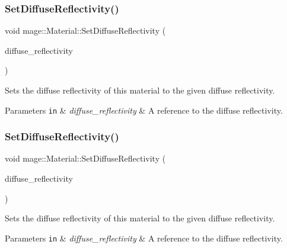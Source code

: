 \subsubsection{\texorpdfstring{Set\+Diffuse\+Reflectivity()}{SetDiffuseReflectivity()}\hspace{0.1cm}{\footnotesize\ttfamily [1/2]}}
{\footnotesize\ttfamily void mage\+::\+Material\+::\+Set\+Diffuse\+Reflectivity (\begin{DoxyParamCaption}\item[{const \hyperlink{structmage_1_1_r_g_b_spectrum}{R\+G\+B\+Spectrum} \&}]{diffuse\+\_\+reflectivity }\end{DoxyParamCaption})\hspace{0.3cm}{\ttfamily [noexcept]}}

Sets the diffuse reflectivity of this material to the given diffuse reflectivity.


\begin{DoxyParams}[1]{Parameters}
\mbox{\tt in}  & {\em diffuse\+\_\+reflectivity} & A reference to the diffuse reflectivity. \\
\hline
\end{DoxyParams}
\hypertarget{structmage_1_1_material_a83281d9408fcdc3c6de6804f31a527b3}{}\label{structmage_1_1_material_a83281d9408fcdc3c6de6804f31a527b3} 
\subsubsection{\texorpdfstring{Set\+Diffuse\+Reflectivity()}{SetDiffuseReflectivity()}\hspace{0.1cm}{\footnotesize\ttfamily [2/2]}}
{\footnotesize\ttfamily void mage\+::\+Material\+::\+Set\+Diffuse\+Reflectivity (\begin{DoxyParamCaption}\item[{\hyperlink{structmage_1_1_r_g_b_spectrum}{R\+G\+B\+Spectrum} \&\&}]{diffuse\+\_\+reflectivity }\end{DoxyParamCaption})\hspace{0.3cm}{\ttfamily [noexcept]}}

Sets the diffuse reflectivity of this material to the given diffuse reflectivity.


\begin{DoxyParams}[1]{Parameters}
\mbox{\tt in}  & {\em diffuse\+\_\+reflectivity} & A reference to the diffuse reflectivity. \\
\hline
\end{DoxyParams}
\hypertarget{structmage_1_1_material_a32e02c92dfd73db1a8a809a45546dc87}{}\label{structmage_1_1_material_a32e02c92dfd73db1a8a809a45546dc87} 
